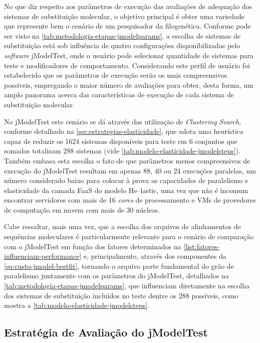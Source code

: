 \documentclass[english,brazilian]{UNISINOSmonografia} %
\begin{document}
No que diz respeito aos parâmetros de execução das avaliações de adequação dos sistemas de substituição molecular, o objetivo principal é obter uma variedade que represente bem o cenário de um pesquisador da filogenética.
Conforme pode ser visto na \autoref{tab:metodologia-etapas-jmodelparams}, a escolha de sistemas de substituição está sob influência de quatro configurações disponibilizadas pelo \textit{software} jModelTest, onde o usuário pode selecionar quantidade de sistemas para teste e modificadores de comportamento.
Considerando este perfil de usuário foi estabelecido que os parâmetros de execução serão os mais compreensivos possíveis, empregando o maior número de avaliações para obter, desta forma, um amplo panorama acerca das características de execução de cada sistema de substituição molecular.


No jModelTest este cenário se dá através das utilização de \textit{Clustering Search}, conforme detalhado na \autoref{sec:estrategias-elasticidade}, que adota uma heurística capaz de reduzir os 1624 sistemas disponíveis para teste em 6 conjuntos que somados totalizam 288 sistemas (vide \autoref{tab:modelo-elasticidade-jmodelsteps}).
Também embasa esta escolha o fato de que parâmetros menos compreensivos de execução do jModelTest resultam em apenas 88, 40 ou 24 execuções paralelas, um número considerado baixo para colocar à prova as capacidades de paralelismo e elasticidade da camada FaaS do modelo \textsf{He}--lastic, uma vez que não é incomum encontrar servidores com mais de 16 \textit{cores} de processamento e VMs de provedores de computação em nuvem com mais de 30 núcleos.


Cabe ressaltar, mais uma vez, que a escolha dos arquivos de alinhamentos de sequências moleculares é particularmente relevante para o cenário de comparação com o jModelTest em função dos fatores determinados na \autoref{list:fatores-influenciam-performance} e, principalmente, através dos componentes da \autoref{eq:custo-jmodel-bestfit}, tornando o arquivo parte fundamental do grão de paralelismo juntamente com os parâmetros do jModelTest, detalhados na \autoref{tab:metodologia-etapas-jmodelparams}, que influenciam diretamente na escolha dos sistemas de substituição incluídos no teste dentre os 288 possíveis, como mostra a \autoref{tab:modelo-elasticidade-jmodelsteps}.



\subsection{Estratégia de Avaliação do jModelTest}
\end{document}
